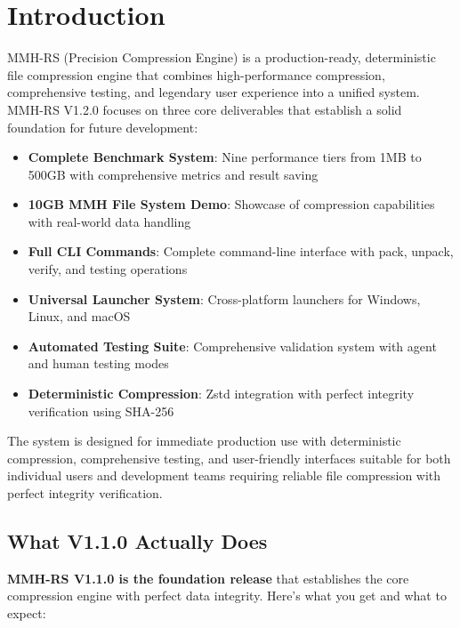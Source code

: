 \documentclass[11pt,a4paper]{article}
\begin{document}
	\section{Introduction}
	\label{sec:intro}
	
	MMH-RS (Precision Compression Engine) is a production-ready, deterministic file compression engine that combines high-performance compression, comprehensive testing, and legendary user experience into a unified system. MMH-RS V1.2.0 focuses on three core deliverables that establish a solid foundation for future development:
	
	\begin{itemize}
		\item \textbf{Complete Benchmark System}: Nine performance tiers from 1MB to 500GB with comprehensive metrics and result saving
		\item \textbf{10GB MMH File System Demo}: Showcase of compression capabilities with real-world data handling
		\item \textbf{Full CLI Commands}: Complete command-line interface with pack, unpack, verify, and testing operations
		\item \textbf{Universal Launcher System}: Cross-platform launchers for Windows, Linux, and macOS
		\item \textbf{Automated Testing Suite}: Comprehensive validation system with agent and human testing modes
		\item \textbf{Deterministic Compression}: Zstd integration with perfect integrity verification using SHA-256
	\end{itemize}
	
	The system is designed for immediate production use with deterministic compression, comprehensive testing, and user-friendly interfaces suitable for both individual users and development teams requiring reliable file compression with perfect integrity verification.
	
	\subsection{What V1.1.0 Actually Does}
	
	\textbf{MMH-RS V1.1.0 is the foundation release} that establishes the core compression engine with perfect data integrity. Here's what you get and what to expect:
	
\end{document}

